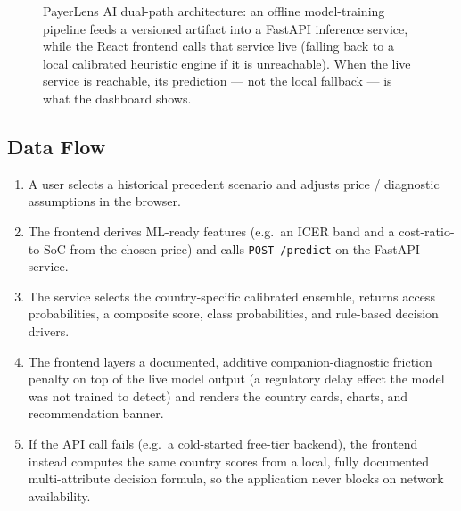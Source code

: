 \documentclass[11pt,a4paper]{article}
\begin{document}
\begin{figure}[h]
\caption{PayerLens AI dual-path architecture: an offline model-training pipeline feeds a
versioned artifact into a FastAPI inference service, while the React frontend calls that service
live (falling back to a local calibrated heuristic engine if it is unreachable). When the live
service is reachable, its prediction --- not the local fallback --- is what the dashboard shows.}
\label{fig:architecture}
\end{figure}

\subsection{Data Flow}
\begin{enumerate}[leftmargin=1.5em]
  \item A user selects a historical precedent scenario and adjusts price / diagnostic assumptions
  in the browser.
  \item The frontend derives ML-ready features (e.g.\ an ICER band and a cost-ratio-to-SoC from
  the chosen price) and calls \texttt{POST /predict} on the FastAPI service.
  \item The service selects the country-specific calibrated ensemble, returns access probabilities,
  a composite score, class probabilities, and rule-based decision drivers.
  \item The frontend layers a documented, additive companion-diagnostic friction penalty on top of
  the live model output (a regulatory delay effect the model was not trained to detect) and renders
  the country cards, charts, and recommendation banner.
  \item If the API call fails (e.g.\ a cold-started free-tier backend), the frontend instead
  computes the same country scores from a local, fully documented multi-attribute decision
  formula, so the application never blocks on network availability.
\end{enumerate}
\end{document}
